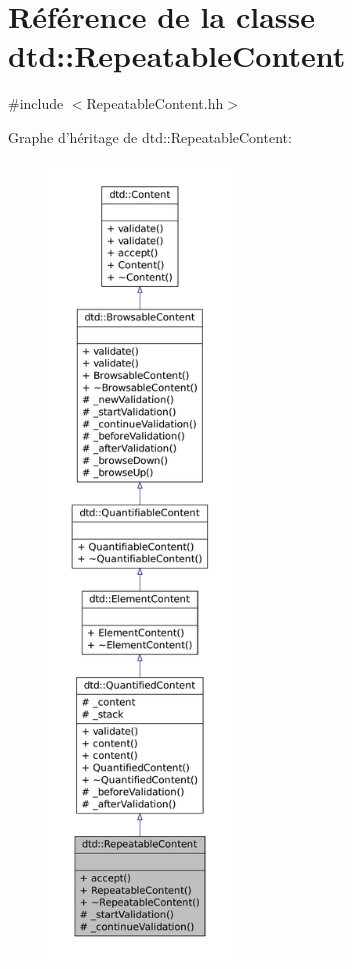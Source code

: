 \hypertarget{classdtd_1_1_repeatable_content}{
\section{Référence de la classe dtd::RepeatableContent}
\label{classdtd_1_1_repeatable_content}
}


{\ttfamily \#include $<$RepeatableContent.hh$>$}



Graphe d'héritage de dtd::RepeatableContent:\nopagebreak
\begin{figure}[H]
\begin{center}
\leavevmode
\includegraphics[height=600pt]{classdtd_1_1_repeatable_content__inherit__graph}
\end{center}
\end{figure}


